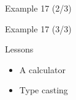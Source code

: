 \begin{frame}{Example 17 (2/3)}



\end{frame}

\begin{frame}{Example 17 (3/3)}



\end{frame}

\begin{frame}{Lessons}

\begin{itemize}
\tightlist
\item
  A calculator
\item
  Type casting
\end{itemize}

\end{frame}
